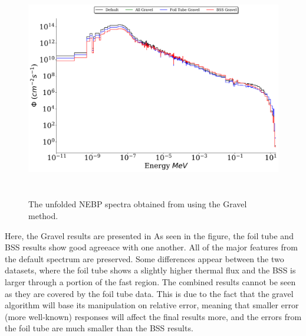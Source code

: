\begin{figure}[htb]
\includegraphics[height=3.8in]{tex/figures/unfolded_gr.png}
\caption[Gravel Unfolded Spectra]{The unfolded NEBP spectra obtained from using the Gravel method.}
\label{fig:unfolded_gr}
\end{figure}

Here, the Gravel results are presented in 
As seen in the figure, the foil tube and BSS results show good agreeace with one another.
All of the major features from the default spectrum are preserved.
Some differences appear between the two datasets, where the foil tube shows a slightly higher thermal flux and the BSS is larger through a portion of the fast region.
The combined results cannot be seen as they are covered by the foil tube data.
This is due to the fact that the gravel algorithm will base its manipulation on relative error, meaning that smaller error (more well-known) responses will affect the final results more, and the errors from the foil tube are much smaller than the BSS results.

